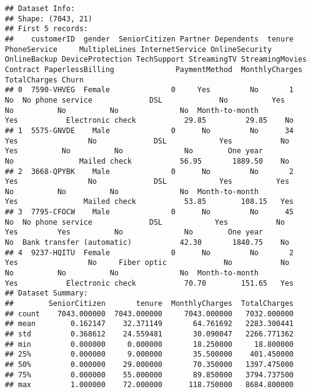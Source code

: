 \documentclass[preprint, 3p,
authoryear]{elsarticle} %
\begin{document}
\begin{verbatim}
## Dataset Info:
## Shape: (7043, 21)
## First 5 records:
##    customerID  gender  SeniorCitizen Partner Dependents  tenure PhoneService     MultipleLines InternetService OnlineSecurity OnlineBackup DeviceProtection TechSupport StreamingTV StreamingMovies        Contract PaperlessBilling              PaymentMethod  MonthlyCharges  TotalCharges Churn
## 0  7590-VHVEG  Female              0     Yes         No       1           No  No phone service             DSL             No          Yes               No          No          No              No  Month-to-month              Yes           Electronic check           29.85         29.85    No
## 1  5575-GNVDE    Male              0      No         No      34          Yes                No             DSL            Yes           No              Yes          No          No              No        One year               No               Mailed check           56.95       1889.50    No
## 2  3668-QPYBK    Male              0      No         No       2          Yes                No             DSL            Yes          Yes               No          No          No              No  Month-to-month              Yes               Mailed check           53.85        108.15   Yes
## 3  7795-CFOCW    Male              0      No         No      45           No  No phone service             DSL            Yes           No              Yes         Yes          No              No        One year               No  Bank transfer (automatic)           42.30       1840.75    No
## 4  9237-HQITU  Female              0      No         No       2          Yes                No     Fiber optic             No           No               No          No          No              No  Month-to-month              Yes           Electronic check           70.70        151.65   Yes
## Dataset Summary:
##        SeniorCitizen       tenure  MonthlyCharges  TotalCharges
## count    7043.000000  7043.000000     7043.000000   7032.000000
## mean        0.162147    32.371149       64.761692   2283.300441
## std         0.368612    24.559481       30.090047   2266.771362
## min         0.000000     0.000000       18.250000     18.800000
## 25%         0.000000     9.000000       35.500000    401.450000
## 50%         0.000000    29.000000       70.350000   1397.475000
## 75%         0.000000    55.000000       89.850000   3794.737500
## max         1.000000    72.000000      118.750000   8684.800000
\end{verbatim}
\end{document}
